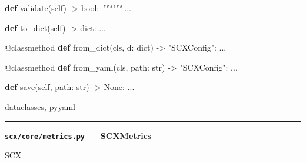 \documentclass[
  12pt,
]{article}
\newenvironment{Shaded}{}{}
\newcommand{\AttributeTok}[1]{\textcolor[rgb]{0.49,0.56,0.16}{#1}}
\newcommand{\BuiltInTok}[1]{\textcolor[rgb]{0.00,0.50,0.00}{#1}}
\newcommand{\CommentTok}[1]{\textcolor[rgb]{0.38,0.63,0.69}{\textit{#1}}}
\newcommand{\KeywordTok}[1]{\textcolor[rgb]{0.00,0.44,0.13}{\textbf{#1}}}
\newcommand{\NormalTok}[1]{#1}
\newcommand{\OperatorTok}[1]{\textcolor[rgb]{0.40,0.40,0.40}{#1}}
\newcommand{\StringTok}[1]{\textcolor[rgb]{0.25,0.44,0.63}{#1}}
\newcommand{\VariableTok}[1]{\textcolor[rgb]{0.10,0.09,0.49}{#1}}
\begin{document}
\begin{Shaded}
\begin{Highlighting}[]
    \KeywordTok{def}\NormalTok{ validate(}\VariableTok{self}\NormalTok{) }\OperatorTok{{-}\textgreater{}} \BuiltInTok{bool}\NormalTok{:}
        \CommentTok{""""""}
\NormalTok{        ...}

    \KeywordTok{def}\NormalTok{ to\_dict(}\VariableTok{self}\NormalTok{) }\OperatorTok{{-}\textgreater{}} \BuiltInTok{dict}\NormalTok{:}
\NormalTok{        ...}

    \AttributeTok{@classmethod}
    \KeywordTok{def}\NormalTok{ from\_dict(cls, d: }\BuiltInTok{dict}\NormalTok{) }\OperatorTok{{-}\textgreater{}} \StringTok{"SCXConfig"}\NormalTok{:}
\NormalTok{        ...}

    \AttributeTok{@classmethod}
    \KeywordTok{def}\NormalTok{ from\_yaml(cls, path: }\BuiltInTok{str}\NormalTok{) }\OperatorTok{{-}\textgreater{}} \StringTok{"SCXConfig"}\NormalTok{:}
\NormalTok{        ...}

    \KeywordTok{def}\NormalTok{ save(}\VariableTok{self}\NormalTok{, path: }\BuiltInTok{str}\NormalTok{) }\OperatorTok{{-}\textgreater{}} \VariableTok{None}\NormalTok{:}
\NormalTok{        ...}
\end{Highlighting}
\end{Shaded}

dataclasses, pyyaml

\begin{center}\rule{0.5\linewidth}{0.5pt}\end{center}

\textbf{\texttt{scx/core/metrics.py} --- SCXMetrics}

SCX 
\end{document}
